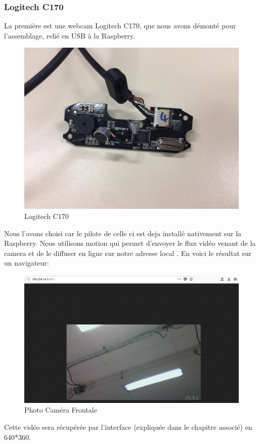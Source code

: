 \documentclass[a4paper,11pt]{report}
\begin{document}
				\subsubsection{Logitech C170}
					La première est une webcam Logitech C170, que nous avons démonté pour l'assemblage, relié en USB à la Raspberry. 
					\begin{figure}[!h]
					\begin{center}
						\includegraphics[scale=0.1]{Photos/Camera11.jpg}
						\caption{Logitech C170}
					\end{center}
				\end{figure}
				\newline Nous l'avons choisi car le pilote de celle ci est deja installé nativement sur la Raspberry. Nous utilisons motion qui permet d'envoyer le flux vidéo venant de la camera et de le diffuser en ligne sur notre adresse local \cite{ref1}. En voici le résultat sur un navigateur:
				\begin{figure}[!h]
					\begin{center}
						\includegraphics[scale=0.4]{Photos/Camera1.png}
						\caption{Photo Caméra Frontale}
					\end{center}
				\end{figure}
				\newline Cette vidéo sera récupérée par l'interface (expliquée dans le chapitre associé) en 640*360.
				
\end{document}
